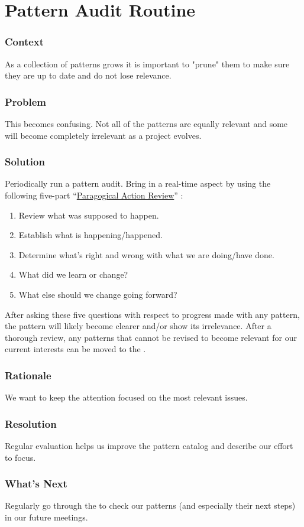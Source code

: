 \section{Pattern Audit Routine}\label{sec:Pattern_Audit_Routine}

\subsubsection*{Context} As a collection of patterns grows it is important to "prune" them to make sure they are up to date and do not lose relevance.

\subsubsection*{Problem} This becomes confusing. Not all of the patterns are equally relevant and some will become completely irrelevant as a project evolves.

\subsubsection*{Solution} Periodically run a pattern audit. Bring in a real-time aspect by using the following five-part ``\href{http://metameso.org/~joe/docs/The-Paragogical-Action-Review.pdf}{Paragogical Action Review}'' \cite[Chapter 28]{peeragogy-handbook}:

\begin{enumerate}
\item Review what was supposed to happen.
\item Establish what is happening/happened.
\item Determine what’s right and wrong with what we are doing/have done.
\item What did we learn or change?
\item What else should we change going forward?
\end{enumerate}

After asking these five questions with respect to progress made with any pattern, the pattern will likely become clearer and/or show its irrelevance.  After a thorough review, any patterns that cannot be revised to become relevant for our current interests can be moved to the .

\subsubsection*{Rationale} We want to keep the attention focused on the most relevant issues.

\subsubsection*{Resolution} Regular evaluation helps us improve the pattern catalog and describe our effort to focus.

\subsubsection*{What's Next} Regularly go through the  to check our patterns (and especially their next steps) in our future meetings.
